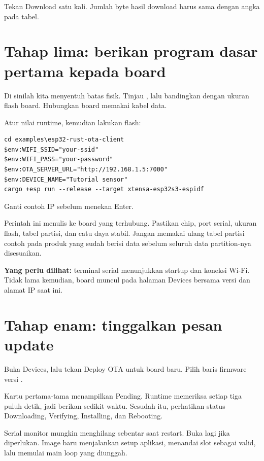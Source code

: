 Tekan Download satu kali. Jumlah byte hasil download harus sama dengan angka pada tabel.

\section{Tahap lima: berikan program dasar pertama kepada board}

Di sinilah kita menyentuh batas fisik. Tinjau , lalu bandingkan dengan ukuran flash board. Hubungkan board memakai kabel data.

Atur nilai runtime, kemudian lakukan flash:

\begin{lstlisting}
cd examples\esp32-rust-ota-client
$env:WIFI_SSID="your-ssid"
$env:WIFI_PASS="your-password"
$env:OTA_SERVER_URL="http://192.168.1.5:7000"
$env:DEVICE_NAME="Tutorial sensor"
cargo +esp run --release --target xtensa-esp32s3-espidf
\end{lstlisting}

Ganti contoh IP sebelum menekan Enter.

\begin{warningbox}
Perintah ini menulis ke board yang terhubung. Pastikan chip, port serial, ukuran flash, tabel partisi, dan catu daya stabil. Jangan memakai ulang tabel partisi contoh pada produk yang sudah berisi data sebelum seluruh data partition-nya disesuaikan.
\end{warningbox}

\textbf{Yang perlu dilihat:} terminal serial menunjukkan startup dan koneksi Wi-Fi. Tidak lama kemudian, board muncul pada halaman Devices bersama versi dan alamat IP saat ini.

\section{Tahap enam: tinggalkan pesan update}

Buka Devices, lalu tekan Deploy OTA untuk board baru. Pilih baris firmware versi .

Kartu pertama-tama menampilkan Pending. Runtime memeriksa setiap tiga puluh detik, jadi berikan sedikit waktu. Sesudah itu, perhatikan status Downloading, Verifying, Installing, dan Rebooting.

Serial monitor mungkin menghilang sebentar saat restart. Buka lagi jika diperlukan. Image baru menjalankan setup aplikasi, menandai slot sebagai valid, lalu memulai main loop yang diunggah.

